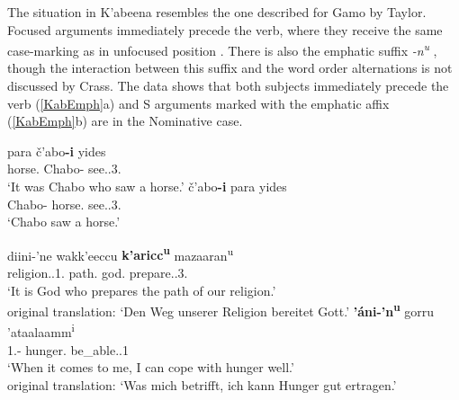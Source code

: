 The situation in K'abeena resembles the one described for Gamo by Taylor. 
Focused arguments immediately precede the verb, where they receive the same case-marking as in unfocused position \citep[327]{Crass:2005}.
There is also the emphatic suffix \emph{-n\textsuperscript{u}} \citep[256]{Crass:2005}, though the interaction between this suffix and the word order alternations is not discussed by Crass. 
The data shows that both subjects immediately precede the verb (\ref{KabEmph}a) and S arguments marked with the emphatic affix (\ref{KabEmph}b) are in the Nominative case. %

\begin{exe}\ex\label{GamEmph}
\begin{xlist} 
\ex\gll para \v c'abo\textbf{-i} yides\\
horse.\acc{} Chabo-\nom{} see.\prf{}.3\sg{}.\mas{}\\
\glt `It was Chabo who saw a horse.'
\ex\gll \v c'abo\textbf{-i} para yides\\
Chabo-\nom{} horse.\acc{} see.\prf{}.3\sg{}.\mas{}\\
\glt `Chabo saw a horse.'
\end{xlist}
\end{exe}

\enlargethispage{\baselineskip}
\begin{exe}\ex\label{KabEmph}
\begin{xlist} 
\ex\gll diini-'ne wakk'eeccu \textbf{k'aricc\textsuperscript{u}} mazaaran\textsuperscript{u}\\
religion.\gen{}.1\pl{}.\poss{} path.\acc{} god.\nom{} prepare.\ipfv{}.3\sg{}.\mas{}\\
\glt `It is God who prepares the path of our religion.' \\
original translation: `Den Weg unserer Religion bereitet Gott.'
\ex\gll \textbf{'\'ani-'n\textsuperscript{u}} gorru 'ataalaamm\textsuperscript{i} \\
1\sg{}.\nom{}-\emphat{} hunger.\acc{} be\_able.\ipfv{}.1\sg{} \\
\glt `When it comes to me, I can cope with hunger well.' \\
original translation: `Was mich betrifft, ich kann Hunger gut ertragen.'
\end{xlist}
\end{exe}

